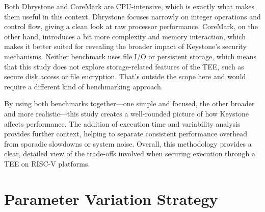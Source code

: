 Both Dhrystone and CoreMark are CPU-intensive, which is exactly what makes them useful in this context. Dhrystone focuses narrowly on integer operations and control flow, giving a clean look at raw processor performance. CoreMark, on the other hand, introduces a bit more complexity and memory interaction, which makes it better suited for revealing the broader impact of Keystone’s security mechanisms. Neither benchmark uses file I/O or persistent storage, which means that this study does not explore storage-related features of the TEE, such as secure disk access or file encryption. That’s outside the scope here and would require a different kind of benchmarking approach.

By using both benchmarks together—one simple and focused, the other broader and more realistic—this study creates a well-rounded picture of how Keystone affects performance. The addition of execution time and variability analysis provides further context, helping to separate consistent performance overhead from sporadic slowdowns or system noise. Overall, this methodology provides a clear, detailed view of the trade-offs involved when securing execution through a TEE on RISC-V platforms.

\section{Parameter Variation Strategy}

